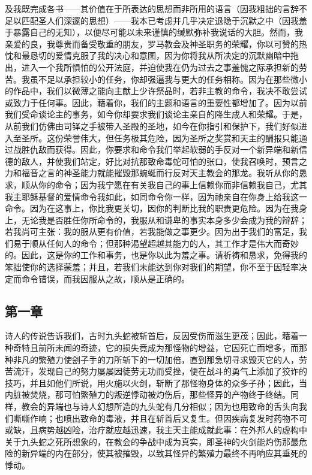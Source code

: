 及我既完成各书——其价值在于所表达的思想而非所用的语言（因我粗拙的言辞不足以匹配圣人们深邃的思想）——我本已考虑并几乎决定退隐于沉默之中（因我羞于暴露自己的无知），以便尽可能以未来谨慎的缄默弥补我说话的大胆。然而，我亲爱的良，我尊贵而备受敬重的朋友，罗马教会及神圣职务的荣耀，你以可赞的热忱和最恳切的爱情克服了我的决心和意图，因为你将我从所决定的沉默幽暗中拖出，进入一个我所惧怕的公开法庭，并迫使我在仍为过去之事羞愧之际承担新的劳苦。我虽不足以承担较小的任务，你却强逼我与更大的任务相称。因为在那些微小的作品中，我们以微薄之能向主献上少许祭品时，若非主教的命令，我决不敢尝试或致力于任何事。因此，藉着你，我们的主题和语言的重要性都增加了。因为以前我们受命谈论主的事务，如今你却要求我们谈论主亲自的降生成人和荣耀。于是，从前我们仿佛由司铎之手被带入圣殿的圣地，如今在你指引和保护下，我们好似进入至圣所。这份荣誉伟大，但任务极其危险，因为圣所之奖赏和天主的酬报只能通过战胜仇敌而获得。因此，你要求和命令我们举起软弱的手反对一个新异端和新信德的敌人，并使我们站定，好比对抗那致命毒蛇可怕的张口，使我召唤时，预言之力和福音之言的神圣能力就能摧毁那蜿蜒而行反对天主教会的那龙。我听从你的恳求，顺从你的命令；因为我宁愿在有关我自己的事上信赖你而非信赖我自己，尤其我主耶稣基督的爱情命令我如此，如同命令你一样，因为祂亲自在你身上给我这一命令。因为在这事上，你比我更关切，因你的判断比我的职责更危险。因为在我身上，无论我是否胜任你所命令的，我服从和谦卑的事实本身多少会成为我的辩辞；若我尚可主张：我的服从更有价值，若我能做之事更少。因为出于我们的富足，我们易于顺从任何人的命令；但那种渴望超越其能力的人，其工作才是伟大而奇妙的。因此，这是你的工作和事务，也是你以此为羞之事。请祈祷和恳求，免得我的笨拙使你的选择蒙羞；并且，若我们未能达到你对我们的期望，你不至于因轻率决定而命令错误，而我因服从之故，顺从是正确的。\par


\subsection{第一章}

\par

诗人的传说告诉我们，古时九头蛇被斩首后，反因受伤而滋生更茂；因此，藉着一种奇特且前所未闻的奇迹，它的损失竟成为那怪物的增益，它因死亡而增多，而那种非凡的繁殖力使刽子手的刀所斩下的一切加倍，直到那急切寻求毁灭它的人，劳苦流汗，发现自己的努力屡屡因徒劳无功而受挫，便在战斗的勇气上添加了狡诈的技巧，并且如他们所说，用火施以火剑，斩断了那怪物身体的众多子孙；因此，当内脏被焚烧，那可怕繁殖力的叛逆悸动被灼伤后，那些怪异的产物终于终结。同样，教会的异端也与诗人幻想所造的九头蛇有几分相似；因为也用致命的舌头向我们嘶嘶作响；也喷出致命的毒液，并且在斩首后又复生。但因疾病复发时药物不可或缺，且病势越凶险，治疗就应越迅速，我主天主能成就此事：在外邦人的虚构中关于九头蛇之死所想象的，在教会的争战中成为真实，即圣神的火剑能灼伤那最危险的新异端的内在部分，使其被摧毁，以致其怪异的繁殖力最终不再响应其垂死的悸动。\par

